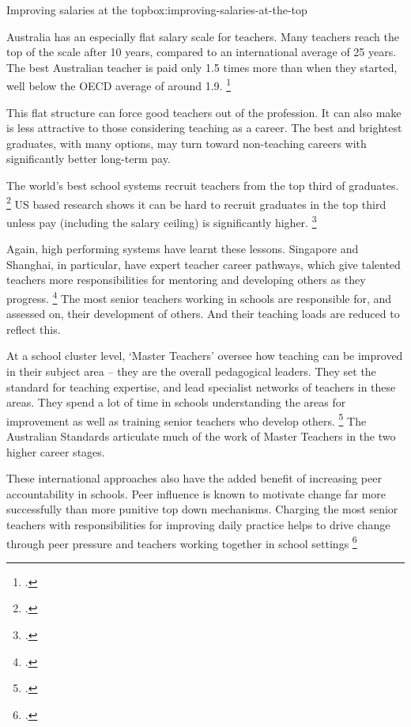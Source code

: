 \documentclass{grattan}
\begin{document}
\begin{smallbox}{Improving salaries at the top}{box:improving-salaries-at-the-top}


Australia has an especially flat salary scale for teachers.
Many teachers reach the top of the scale after 10 years, compared to an international average of 25 years.
The best Australian teacher is paid only 1.5 times more than when they started, well below the OECD average of around 1.9.%
\footcite{OECD2016EducationGlance2016}

This flat structure can force good teachers out of the profession. It can also make is less attractive to those considering teaching as a career. The best and brightest graduates, with many options, may turn toward non-teaching careers with significantly better long-term pay.

The world's best school systems recruit teachers from the top third of graduates.%
\footcite{Barber2007HowWorldsBest} US based research shows it can be hard to recruit graduates in the top third unless pay (including the salary ceiling) is significantly higher.%
\footcite{Auguste2010ClosingTalentGap}
\end{smallbox}

Again, high performing systems have learnt these lessons.
Singapore and Shanghai, in particular, have expert teacher career pathways, which give talented teachers more responsibilities for mentoring and developing others as they progress.%
\footcites{Jensen2012CatchingUpLearning}{Jensen2016PDTeacherProfessional}{Zhang2016DevelopingShanghaisTeachers} The most senior teachers working in schools are responsible for, and assessed on, their development of others.
And their teaching loads are reduced to reflect this.

At a school cluster level, `Master Teachers' oversee how teaching can be improved in their subject area -- they are the overall pedagogical leaders.
They set the standard for teaching expertise, and lead specialist networks of teachers in these areas.
They spend a lot of time in schools understanding the areas for improvement as well as training senior teachers who develop others.%
\footcite{Jensen2016PDTeacherProfessional}
The Australian Standards articulate much of the work of Master Teachers in the two higher career stages.

These international approaches also have the added benefit of increasing peer accountability in schools.
Peer influence is known to motivate change far more successfully than more punitive top down mechanisms. Charging the most senior teachers with responsibilities for improving daily practice helps to drive change through peer pressure and teachers working together in school settings%
\footcites{Fullan2011ChoosingWrongDrivers}[][39]{Goss2015TargetedTeachingHow}
\end{document}
